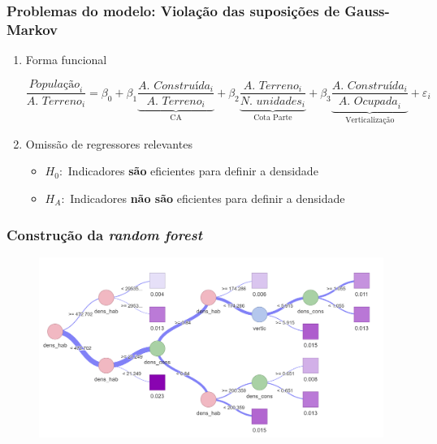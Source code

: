 \documentclass[%
    8pt, 
    aspectratio=169,
]{beamer}
\begin{document}
\begin{frame}
    \frametitle{Problemas do modelo: Violação das suposições de Gauss-Markov}

    \begin{enumerate}
        \item Forma funcional

        \begin{equation*}
            \frac{\textit{População}_i}{\textit{A. Terreno}_i}=
            \beta_0+
            \beta_1\underbrace{\frac{\textit{A. Construída}_i}{\textit{A. Terreno}_i}}_\text{CA}+
            \beta_2\underbrace{\frac{\textit{A. Terreno}_i}{\textit{N. unidades}_i}}_\text{Cota Parte}+
            \beta_3\underbrace{\frac{\textit{A. Construída}_i}{\textit{A. Ocupada}_i}}_\text{Verticalização}+\varepsilon_i
        \end{equation*}

        \bigskip
        \item<2-> Omissão de regressores relevantes
        \begin{itemize}
            \item $H_0:$ Indicadores \textbf{são} eficientes para definir a densidade
            \item $H_A:$ Indicadores \textbf{não são} eficientes para definir a densidade
        \end{itemize}    
    \end{enumerate}
\end{frame}

\begin{frame}
    \frametitle{Construção da \textit{random forest}}
    \begin{figure}
        \includegraphics[width = .9\textwidth]{imagens/tree_example.png}
    \end{figure}
\end{frame}
\end{document}
